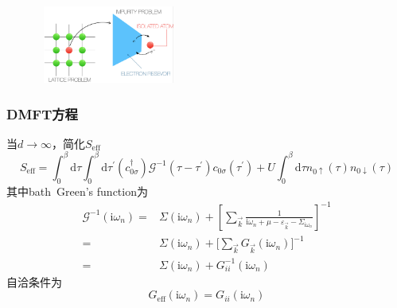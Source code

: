 {{\begin{minipage}[b]{0.39\linewidth}
\begin{figure}[h!]
\centering
\vspace{-20pt}
\includegraphics[height=1.0in,width=1.85in,viewport=0 0 750 455,clip]{Figures/Dmft_lattice-atom.png}
\label{Dmft_lattice-atom.}
\end{figure}
\end{minipage}
}

\frame
{
	\frametitle{\textrm{DMFT}方程}
	当$d\rightarrow\infty$，简化$S_{\mathrm{eff}}$
	\begin{displaymath}
		S_{\mathrm{eff}}=\int_0^{\beta}\mathrm{d}\tau\int_0^{\beta}\mathrm{d}\tau^{\prime}(c_{0\sigma}^{\dag})\mathcal{G}^{-1}(\tau-\tau^{\prime})c_{0\sigma}(\tau^{\prime})+U\int_0^{\beta}\mathrm{d}\tau n_{0\uparrow}(\tau)n_{0\downarrow}(\tau)
	\end{displaymath}
	其中\textrm{bath~Green's function}为
	\begin{displaymath}
		\begin{aligned}
			\mathcal{G}^{-1}(\mathrm{i}\omega_n)=&\Sigma(\mathrm{i}\omega_n)+\left[\sum_{\vec k}\frac1{\mathrm{i}\omega_n+\mu-\varepsilon_{\vec k}-\Sigma_{\mathrm{i}\omega_n}}\right]^{-1}\\
			=&\Sigma(\mathrm{i}\omega_n)+\big[\sum_{\vec k}G_{\vec k}(\mathrm{i}\omega_n)\big]^{-1}\\
			=&\Sigma(\mathrm{i}\omega_n)+G_{ii}^{-1}(\mathrm{i}\omega_n)
		\end{aligned}
	\end{displaymath}
	自洽条件为
	\begin{displaymath}
		G_{\mathrm{eff}}(\mathrm{i}\omega_n)=G_{ii}(\mathrm{i}\omega_n)
	\end{displaymath}
}

}
